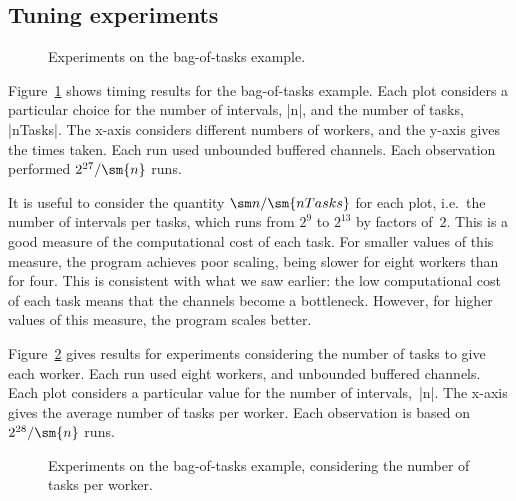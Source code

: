 \subsection{Tuning experiments}


\begin{figure}
\begin{center}

\end{center}
\caption{Experiments on the bag-of-tasks example.}
\label{fig:bag-of-tasks-experiment}
\end{figure}


Figure~\ref{fig:bag-of-tasks-experiment} shows timing results
for the bag-of-tasks example.  Each plot considers a particular choice for the
number of intervals, |n|, and the number of tasks, |nTasks|.  The x-axis
considers different numbers of workers, and the y-axis gives the times taken.
Each run used unbounded buffered channels.  Each observation performed
$2^{27}/\sm{n}$ runs.

It is useful to consider the quantity $\sm n / \sm{nTasks}$ for each plot,
i.e.~the number of intervals per tasks, which runs from $2^9$ to $2^{13}$ by
factors of~$2$.  This is a good measure of the computational cost of each
task.   For smaller values of this measure, the program achieves poor scaling,
being slower for eight workers than for four.  This is consistent with what we
saw earlier: the low computational cost of each task means that the channels
become a bottleneck.  However, for higher values of this measure, the program
scales better.  


Figure~\ref{fig:bag-of-tasks-experiment-2} gives results for experiments
considering the number of tasks to give each worker.  Each run used eight
workers, and unbounded buffered channels.  Each plot considers a particular
value for the number of intervals,~|n|.  The x-axis gives the average number
of tasks per worker.  Each observation is based on $2^{28}/\sm{n}$ runs.

\begin{figure}
\begin{center}

\end{center}
\caption{Experiments on the bag-of-tasks example, considering the number of
  tasks per worker.}
\label{fig:bag-of-tasks-experiment-2}
\end{figure}

